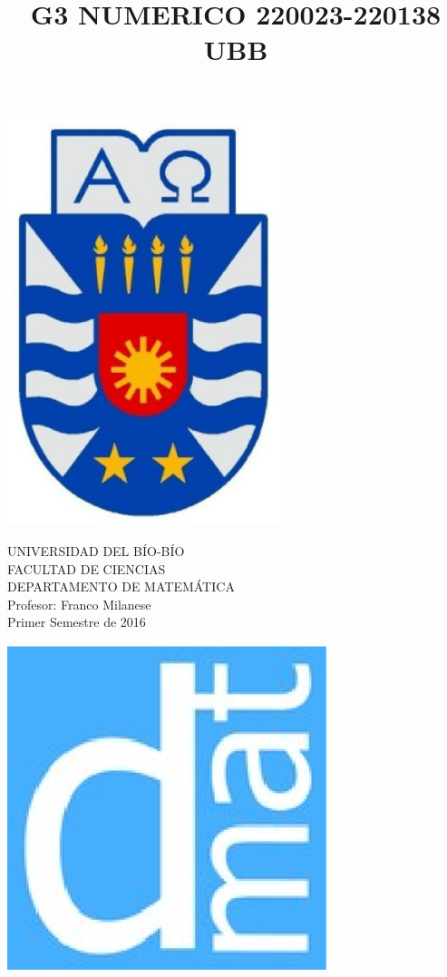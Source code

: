 \documentclass[11pt]{article}
\begin{document}
\title{G3 NUMERICO 220023-220138 UBB}

{\begin{minipage}{2cm}
\hspace*{1cm}\includegraphics[width=0.6\textwidth]{escubo-ubb.eps}
\end{minipage}
\begin{minipage}{12cm}
\small
{\bf \rm 
{
\begin{center}
{\footnotesize UNIVERSIDAD DEL B\'IO-B\'IO} \\
{\scriptsize FACULTAD DE CIENCIAS}  \\
{\scriptsize DEPARTAMENTO DE MATEM\'ATICA}  \\
{\scriptsize Profesor:  Franco Milanese}\\
{\scriptsize Primer Semestre de 2016}
\end{center}
}}
\end{minipage}}
{\begin{minipage}{2cm}
\hspace*{-0.5cm}\vspace*{-0.05cm}\includegraphics[width=0.7\textwidth]{escudo-dmat.eps}
\end{minipage}}
\end{document}
